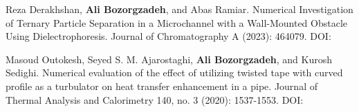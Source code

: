   \shorthandoff{:}
\begin{scholarship}


  {
    \label{pub:derakhshan2023}
    Reza Derakhshan, \textbf{Ali Bozorgzadeh}, and Abas Ramiar.
    Numerical Investigation of Ternary Particle Separation in a Microchannel with a Wall-Mounted Obstacle Using Dielectrophoresis.
    Journal of Chromatography A (2023): 464079. DOI: 
  }

  {
    Masoud Outokesh, Seyed S. M. Ajarostaghi, \textbf{Ali Bozorgzadeh}, and Kurosh Sedighi.
    Numerical evaluation of the effect of utilizing twisted tape with curved profile as a turbulator on heat transfer enhancement in a pipe.
    Journal of Thermal Analysis and Calorimetry 140, no. 3 (2020): 1537-1553. DOI: 
  }
  \shorthandon{:}
\end{scholarship}
